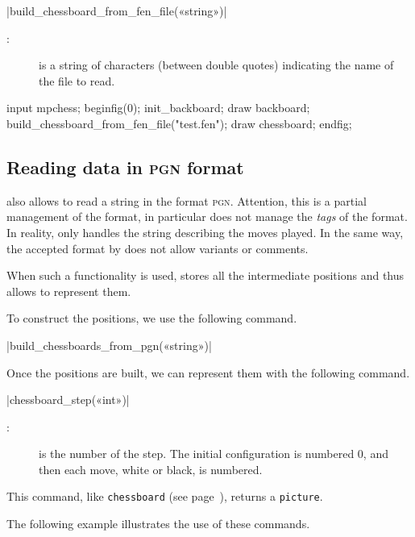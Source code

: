 \documentclass[english]{ltxdoc}
\begin{document}
\commande|build_chessboard_from_fen_file(«string»)|\smallskip

\begin{description}
  \item[:] is a string of characters (between double quotes)
  indicating the name of the file to read.  
\end{description}


\begin{ExempleMP}
input mpchess;
beginfig(0);
init_backboard;
draw backboard;
build_chessboard_from_fen_file("test.fen");
draw chessboard;
endfig;
\end{ExempleMP}

\subsection{Reading data in \textsc{pgn} format}

\mpchess also allows to read a string in the format \textsc{pgn}.
Attention, this is a partial management of the format, in particular \mpchess
does not manage the \emph{tags} of the format. In reality, \mpchess only handles
the string describing the moves played. In the same way, the accepted format
 by \mpchess does not allow variants or comments.

When such a functionality is used, \mpchess stores all the
intermediate positions and thus allows to represent them.

To construct the positions, we use the following command.

\commande|build_chessboards_from_pgn(«string»)|\smallskip


Once the positions are built, we can represent them with the following command.

\commande|chessboard_step(«int»)|\smallskip
\begin{description}
\item[:] is the number of the step. The initial configuration is numbered 0, and then each move, white or black, is numbered.
\end{description}

This command, like \lstinline+chessboard+ (see page~\pageref{com:chessboard}),
returns a \lstinline+picture+. 

The following example illustrates the use of these commands.
\end{document}
